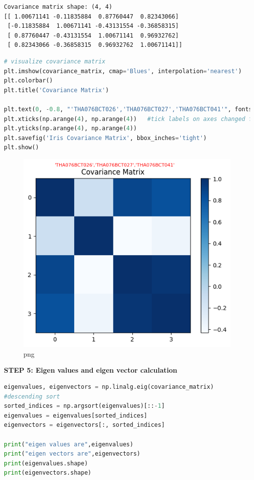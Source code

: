 \documentclass[
]{article}
\begin{document}
\begin{lstlisting}
Covariance matrix shape: (4, 4)
[[ 1.00671141 -0.11835884  0.87760447  0.82343066]
 [-0.11835884  1.00671141 -0.43131554 -0.36858315]
 [ 0.87760447 -0.43131554  1.00671141  0.96932762]
 [ 0.82343066 -0.36858315  0.96932762  1.00671141]]
\end{lstlisting}

\begin{lstlisting}[language=Python]
# visualize covariance matrix
plt.imshow(covariance_matrix, cmap='Blues', interpolation='nearest')
plt.colorbar()
plt.title('Covariance Matrix')

plt.text(0, -0.8, "'THA076BCT026','THA076BCT027','THA076BCT041'", fontsize=8,color='red')
plt.xticks(np.arange(4), np.arange(4))   #tick labels on axes changed from 0 to 4
plt.yticks(np.arange(4), np.arange(4))
plt.savefig('Iris Covariance Matrix', bbox_inches='tight')
plt.show()
\end{lstlisting}

\begin{figure}
\centering
\includegraphics{PCA on IRIS_files/PCA on IRIS_22_0.png}
\caption{png}
\end{figure}

\textbf{STEP 5: Eigen values and eigen vector calculation}

\begin{lstlisting}[language=Python]
eigenvalues, eigenvectors = np.linalg.eig(covariance_matrix)
#descending sort
sorted_indices = np.argsort(eigenvalues)[::-1]
eigenvalues = eigenvalues[sorted_indices]
eigenvectors = eigenvectors[:, sorted_indices]

print("eigen values are",eigenvalues)
print("eigen vectors are",eigenvectors)
print(eigenvalues.shape)
print(eigenvectors.shape)
\end{lstlisting}
\end{document}
